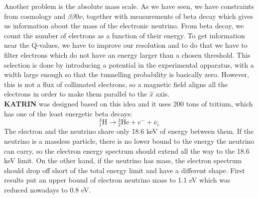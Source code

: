 \documentclass[10.75pt,a4paper,openright,bottom=2cm]{article}
\begin{document}
Another problem is the absolute mass scale. As we have seen, we have constraints from cosmology and $\beta\beta0\nu$, together with measurements of beta decay which gives us information about the mass of the electronic neutrino. From beta decay, we count the number of electrons as a function of their energy. To get information near the Q-values, we have to improve our resolution and to do that we have to filter electrons which do not have an energy larger than a chosen threshold. This selection is done by introducing a potential in the experimental apparatus, with a width large enough so that the tunnelling probability is basically zero. However, this is not a flux of collimated electrons, so a magnetic field aligns all the electrons in order to make them parallel to the $\hat{x}$ axis.\\ \textbf{KATRIN} was designed based on this idea and it uses 200 tons of tritium, which has one of the least energetic beta decays:
\[
\text{$^3_1$H}\to\text{$^3_2$He}+e^-+\overline{\nu}_e
\]
The electron and the neutrino share only 18.6 keV of energy between them.  If the neutrino is a massless particle, there is no lower bound to the energy the neutrino can carry, so the electron energy spectrum should extend all the way to the 18.6 keV limit. On the other hand, if the neutrino has mass, the electron spectrum should drop off short of the total energy limit and have a different shape. First results put an upper bound of electron neutrino mass to 1.1 eV which was reduced nowadays to 0.8 eV. 
\end{document}
